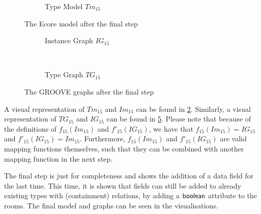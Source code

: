 \begin{figure}[p]
\begin{subfigure}{0.98\textwidth}
        \caption{Type Model $Tm_{15}$}
        \label{fig:application:building_the_model:living_rooms:ecore:type_model}
    \end{subfigure}
    \caption{The Ecore model after the final step}
    \label{fig:application:building_the_model:living_rooms:ecore}
\end{figure}

\begin{figure}[p]
    \centering
    \begin{subfigure}{0.98\textwidth}
        \centering
        
        \caption{Instance Graph $IG_{15}$}
        \label{fig:application:building_the_model:living_rooms:groove:instance_graph}
    \end{subfigure}
    \\
    \begin{subfigure}{0.98\textwidth}
        \centering
        
        \caption{Type Graph $TG_{15}$}
        \label{fig:application:building_the_model:living_rooms:groove:type_graph}
    \end{subfigure}
    \caption{The GROOVE graphs after the final step}
    \label{fig:application:building_the_model:living_rooms:groove}
\end{figure}

A visual representation of $Tm_{15}$ and $Im_{15}$ can be found in \cref{fig:application:building_the_model:living_rooms:ecore}. Similarly, a visual representation of $TG_{15}$ and $IG_{15}$ can be found in \cref{fig:application:building_the_model:living_rooms:groove}. Please note that because of the definitions of $f_{15}(Im_{15})$ and $f'_{15}(IG_{15})$, we have that $f_{15}(Im_{15}) = IG_{15}$ and $f'_{15}(IG_{15}) = Im_{15}$. Furthermore, $f_{15}(Im_{15})$ and $f'_{15}(IG_{15})$ are valid mapping functions themselves, such that they can be combined with another mapping function in the next step.

The final step is just for completeness and shows the addition of a data field for the last time. This time, it is shown that fields can still be added to already existing types with (containment) relations, by adding a $\mathsf{boolean}$ attribute to the rooms. The final model and graphs can be seen in the visualisations.

\afterpage{\FloatBarrier}